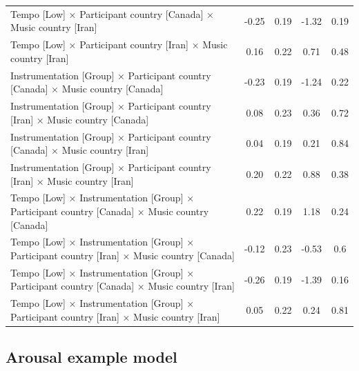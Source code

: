 \documentclass[
  bookmarksnumbered]{article}
\begin{document}
\begin{table}[H]
{\begin{tabular}[t]{lcccc}
\hspace{1em}Tempo [Low] × Participant country [Canada] × Music country [Iran] & -0.25 & 0.19 & -1.32 & 0.19\\
\hspace{1em}Tempo [Low] × Participant country [Iran] × Music country [Iran] & 0.16 & 0.22 & 0.71 & 0.48\\
\hspace{1em}Instrumentation [Group] × Participant country [Canada] × Music country [Canada] & -0.23 & 0.19 & -1.24 & 0.22\\
\hspace{1em}Instrumentation [Group] × Participant country [Iran] × Music country [Canada] & 0.08 & 0.23 & 0.36 & 0.72\\
\hspace{1em}Instrumentation [Group] × Participant country [Canada] × Music country [Iran] & 0.04 & 0.19 & 0.21 & 0.84\\
\hspace{1em}Instrumentation [Group] × Participant country [Iran] × Music country [Iran] & 0.20 & 0.22 & 0.88 & 0.38\\
\hspace{1em}Tempo [Low] × Instrumentation [Group] × Participant country [Canada] × Music country [Canada] & 0.22 & 0.19 & 1.18 & 0.24\\
\hspace{1em}Tempo [Low] × Instrumentation [Group] × Participant country [Iran] × Music country [Canada] & -0.12 & 0.23 & -0.53 & 0.6\\
\hspace{1em}Tempo [Low] × Instrumentation [Group] × Participant country [Canada] × Music country [Iran] & -0.26 & 0.19 & -1.39 & 0.16\\
\hspace{1em}Tempo [Low] × Instrumentation [Group] × Participant country [Iran] × Music country [Iran] & 0.05 & 0.22 & 0.24 & 0.81\\
\bottomrule
\end{tabular}}
\end{table}

\hypertarget{arousal-example-model}{%
\subsection{Arousal example model}\label{arousal-example-model}}
\end{document}
